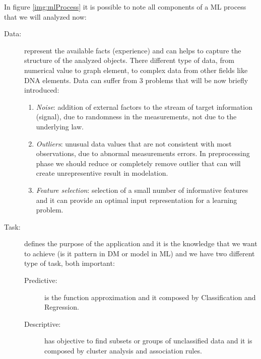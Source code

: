 In figure \ref{img:mlProcess} it is possible to note all components of a ML process that we will analyzed now:
\begin{description}
    \item [Data: ] represent the available facts (experience) and can helps to capture the structure
                   of the analyzed objects.\newline
                   There different type of data, from numerical value to graph element, to complex data
                   from other fields like DNA elements.\newline
                   Data can suffer from $3$ problems that will be now briefly introduced:
                   \begin{enumerate}
                        \item \emph{Noise}: addition of external factors to the stream of target information (signal),
                              due to randomness in the measurements, not due to the underlying law.
                        \item \emph{Outliers}: unusual data values that are not consistent with most
                                               observations, due to abnormal measurements errors.\newline
                                               In preprocessing phase we should reduce or completely remove 
                                               outlier that can will create unrepresentive result in modelation.
                        \item \emph{Feature selection}: selection of a small number of informative features and it
                                    can provide an optimal input representation for a learning problem.
                   \end{enumerate}
    \item [Task: ] defines the purpose of the application and it is the knowledge that we want to achieve
                   (is it pattern in DM or model in ML) and we have two different type of task, both important:
                   \begin{description}
                        \item [Predictive: ] is the function approximation and it composed 
                                             by Classification and Regression.
                        \item [Descriptive: ] has objective to find subsets or groups of unclassified data 
                        and it is composed by cluster analysis and association rules.

\end{description}
\end{description}
